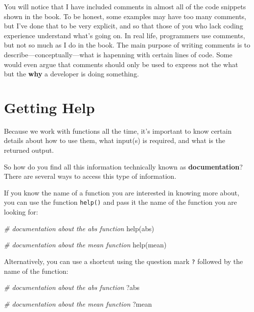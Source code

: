 \documentclass[
]{book}
\newenvironment{Shaded}{\begin{snugshade}}{\end{snugshade}}
\newcommand{\CommentTok}[1]{\textcolor[rgb]{0.56,0.35,0.01}{\textit{#1}}}
\newcommand{\FunctionTok}[1]{\textcolor[rgb]{0.00,0.00,0.00}{#1}}
\newcommand{\NormalTok}[1]{#1}
\begin{document}
You will notice that I have included comments in almost all of the code
snippets shown in the book. To be honest, some examples may have too many
comments, but I've done that to be very explicit, and so that those of you
who lack coding experience understand what's going on. In real life, programmers
use comments, but not so much as I do in the book. The main purpose of
writing comments is to describe---conceptually---what is hapenning with certain
lines of code. Some would even argue that comments should only be used to
express not the what but the \textbf{why} a developer is doing something.

\hypertarget{help-documentation}{%
\section{Getting Help}\label{help-documentation}}

Because we work with functions all the time, it's important to know certain
details about how to use them, what input(s) is required, and what is the
returned output.

So how do you find all this information technically known as \textbf{documentation}?
There are several ways to access this type of information.

If you know the name of a function you are interested in knowing more about,
you can use the function \texttt{help()} and pass it the name of the function you
are looking for:

\begin{Shaded}
\begin{Highlighting}[]
\CommentTok{\# documentation about the \textquotesingle{}abs\textquotesingle{} function}
\FunctionTok{help}\NormalTok{(abs)}

\CommentTok{\# documentation about the \textquotesingle{}mean\textquotesingle{} function}
\FunctionTok{help}\NormalTok{(mean)}
\end{Highlighting}
\end{Shaded}

Alternatively, you can use a shortcut using the question mark \texttt{?} followed
by the name of the function:

\begin{Shaded}
\begin{Highlighting}[]
\CommentTok{\# documentation about the \textquotesingle{}abs\textquotesingle{} function}
\NormalTok{?abs}

\CommentTok{\# documentation about the \textquotesingle{}mean\textquotesingle{} function}
\NormalTok{?mean}
\end{Highlighting}
\end{Shaded}
\end{document}
